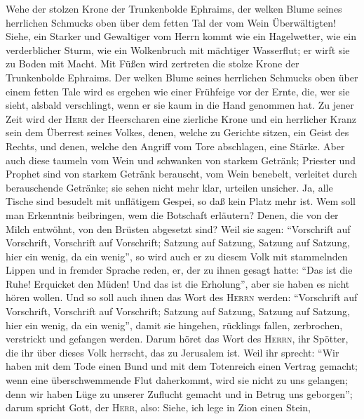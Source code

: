  Wehe der stolzen Krone der Trunkenbolde Ephraims, der
welken Blume seines herrlichen Schmucks oben über dem fetten Tal der vom
Wein Überwältigten!  Siehe, ein Starker und Gewaltiger vom
Herrn kommt wie ein Hagelwetter, wie ein verderblicher Sturm, wie ein
Wolkenbruch mit mächtiger Wasserflut; er wirft sie zu Boden mit Macht.
 Mit Füßen wird zertreten die stolze Krone der
Trunkenbolde Ephraims.  Der welken Blume seines herrlichen
Schmucks oben über einem fetten Tale wird es ergehen wie einer Frühfeige
vor der Ernte, die, wer sie sieht, alsbald verschlingt, wenn er sie kaum
in die Hand genommen hat.  Zu jener Zeit wird der
\textsc{Herr} der Heerscharen eine zierliche Krone und ein herrlicher
Kranz sein dem Überrest seines Volkes,  denen, welche zu
Gerichte sitzen, ein Geist des Rechts, und denen, welche den Angriff vom
Tore abschlagen, eine Stärke.  Aber auch diese taumeln vom
Wein und schwanken von starkem Getränk; Priester und Prophet sind von
starkem Getränk berauscht, vom Wein benebelt, verleitet durch
berauschende Getränke; sie sehen nicht mehr klar, urteilen unsicher.
 Ja, alle Tische sind besudelt mit unflätigem Gespei, so
daß kein Platz mehr ist.  Wem soll man Erkenntnis
beibringen, wem die Botschaft erläutern? Denen, die von der Milch
entwöhnt, von den Brüsten abgesetzt sind?  Weil sie
sagen: ``Vorschrift auf Vorschrift, Vorschrift auf Vorschrift; Satzung
auf Satzung, Satzung auf Satzung, hier ein wenig, da ein wenig'',
 so wird auch er zu diesem Volk mit stammelnden Lippen
und in fremder Sprache reden,  er, der zu ihnen gesagt
hatte: ``Das ist die Ruhe! Erquicket den Müden! Und das ist die
Erholung'', aber sie haben es nicht hören wollen.  Und so
soll auch ihnen das Wort des \textsc{Herrn} werden: ``Vorschrift auf
Vorschrift, Vorschrift auf Vorschrift; Satzung auf Satzung, Satzung auf
Satzung, hier ein wenig, da ein wenig'', damit sie hingehen, rücklings
fallen, zerbrochen, verstrickt und gefangen werden. 
Darum höret das Wort des \textsc{Herrn}, ihr Spötter, die ihr über
dieses Volk herrscht, das zu Jerusalem ist.  Weil ihr
sprecht: ``Wir haben mit dem Tode einen Bund und mit dem Totenreich
einen Vertrag gemacht; wenn eine überschwemmende Flut daherkommt, wird
sie nicht zu uns gelangen; denn wir haben Lüge zu unserer Zuflucht
gemacht und in Betrug uns geborgen'';  darum spricht
Gott, der \textsc{Herr}, also: Siehe, ich lege in Zion einen Stein,
